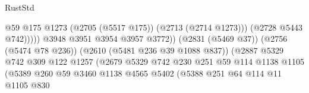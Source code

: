 \begin{lexlean}{RustStd}
\begin{coremodule}
                                                              @59
                                                              @175
                                                              @1273
                                                              (@2705 (@5517 @175))
                                                              (@2713 (@2714 @1273)))
                                                            (@2728 @5443 @742)))))
                                                    @3948
                                                    @3951
                                                    @3954
                                                    @3957
                                                    @3772))
                                                (@2831 (@5469 @37))
                                                (@2756 (@5474 @78 @236))
                                                (@2610 (@5481 @236 @39 @1088 @837))
                                                (@2887
                                                  @5329
                                                  @742
                                                  @309
                                                  @122
                                                  @1257
                                                  (@2679
                                                    @5329
                                                    @742
                                                    @230
                                                    @251
                                                    @59
                                                    @114
                                                    @1138
                                                    @1105
                                                    (@5389
                                                      @260
                                                      @59
                                                      @3460
                                                      @1138
                                                      @4565
                                                      @5402
                                                      (@5388
                                                        @251
                                                        @64
                                                        @114
                                                        @11
                                                        @1105
                                                        @830

\end{coremodule}
\end{lexlean}
